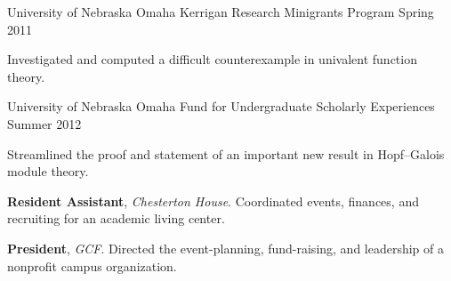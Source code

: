 \documentclass[11pt, letterpaper]{awesome-cv}
\begin{document}

\begin{cventries}
\cventry
	{University of Nebraska Omaha}
	{Kerrigan Research Minigrants Program}
	{}
	{Spring 2011}
	{
		\begin{cvitems}
			\item{Investigated and computed a difficult counterexample in univalent function theory.}
		\end{cvitems}
	}
	
\cventry
	{University of Nebraska Omaha}
	{Fund for Undergraduate Scholarly Experiences}
	{}
	{Summer 2012}
	{
		\begin{cvitems}
			\item{Streamlined the proof and statement of an important new result in Hopf--Galois module theory.}
		\end{cvitems}
	}
	
\end{cventries}








\begin{cvparagraph}
\textbf{Resident Assistant}, \emph{Chesterton House}. Coordinated events, finances, and recruiting for an academic living center.
\end{cvparagraph}

\begin{cvparagraph}
\textbf{President}, \emph{GCF}. Directed the event-planning, fund-raising, and leadership of a nonprofit campus organization.
\end{cvparagraph}
\end{document}
